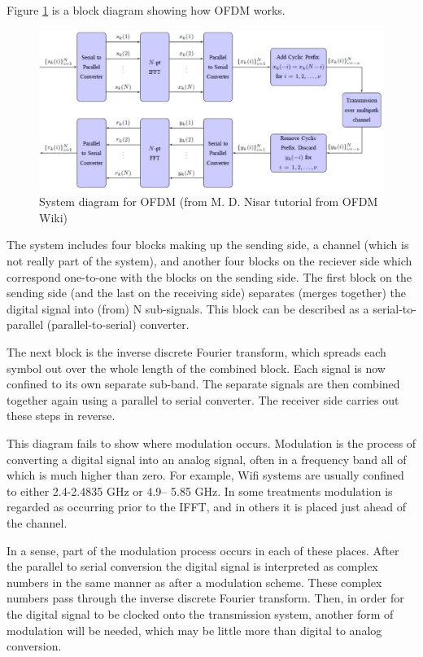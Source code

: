Figure \ref{ofdmfig} is a block diagram showing how OFDM works.
\begin{figure}
\begin{center}
\includegraphics[width=15 cm]{ofdmfig.png}
\caption{System diagram for OFDM (from M. D. Nisar tutorial from OFDM Wiki)}\label{ofdmfig}
\end{center}
\end{figure}

The system includes four blocks making up the sending side, a channel (which is not really
part of the system), and another four blocks on the reciever side which correspond one-to-one
with the blocks on the sending side. The first block on the sending side (and the last on the
receiving side) separates (merges together) the digital signal into (from) N sub-signals. This
block can be described as a serial-to-parallel (parallel-to-serial) converter.

The next block is the inverse discrete Fourier transform, which spreads each symbol out over
the whole length of the combined block. Each signal is now confined to its own separate
sub-band. The separate signals are then combined together again using a parallel to serial
converter. The receiver side carries out these steps in reverse.

This diagram fails to show where modulation occurs. Modulation is the process of converting
a digital signal into an analog signal, often in a frequency band all of which is much higher
than zero. For example, Wifi systems are usually confined to either 2.4-2.4835 GHz or 4.9–
5.85 GHz. In some treatments modulation is regarded as occurring prior to the IFFT, and in
others it is placed just ahead of the channel.

In a sense, part of the modulation process occurs in each of these places. After the parallel to
serial conversion the digital signal is interpreted as complex numbers in the same manner as
after a modulation scheme. These complex numbers pass through the inverse discrete Fourier
transform. Then, in order for the digital signal to be clocked onto the transmission system,
another form of modulation will be needed, which may be little more than digital to analog
conversion.


